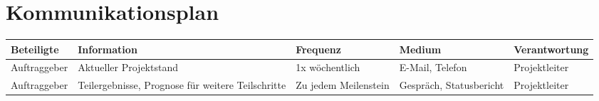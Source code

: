 \section{Kommunikationsplan}

\begin{center}
\begin{tabular}{|p{2cm}|p{4cm}|p{2.3cm}|p{2.7cm}|p{2.7cm}|}
\hline 
\textbf{Beteiligte} & \textbf{Information} & \textbf{Frequenz} & \textbf{Medium} & \textbf{Verantwortung}\\ 
\hline 
Auftraggeber & Aktueller Projektstand & 1x wöchentlich & E-Mail, Telefon & Projektleiter \\ 
\hline 
Auftraggeber & Teilergebnisse, Prognose für weitere Teilschritte & Zu jedem Meilenstein & Gespräch, Statusbericht & Projektleiter \\
\hline 

\end{tabular}
\end{center}